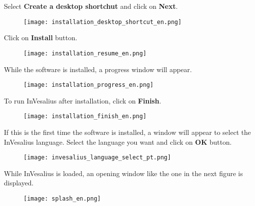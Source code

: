\hspace{.2cm}

Select \textbf{Create a desktop shortchut} and click on \textbf{Next}.

\begin{figure}[!htb]
\centering
\texttt{[image: installation\_desktop\_shortcut\_en.png]}
\end{figure}

\newpage

Click on \textbf{Install} button.

\begin{figure}[!htb]
\centering
\texttt{[image: installation\_resume\_en.png]}
\end{figure}

\hspace{.2cm}

While the software is installed, a progress window will appear.

\begin{figure}[!htb]
\centering
\texttt{[image: installation\_progress\_en.png]}
\end{figure}

\newpage

To run InVesalius after installation, click on \textbf{Finish}.

\begin{figure}[!htb]
\centering
\texttt{[image: installation\_finish\_en.png]}
\end{figure}

\hspace{.2cm}

If this is the first time the software is installed, a window will appear to select the InVesalius language. Select the language you want and click on \textbf{OK} button.

\begin{figure}[!htb]
\centering
\texttt{[image: invesalius\_language\_select\_pt.png]}
\end{figure}

\newpage

While InVesalius is loaded, an opening window like the one in the next figure is displayed.

\begin{figure}[!htb]
\centering
\texttt{[image: splash\_en.png]}
\end{figure}

\hspace{.2cm}

